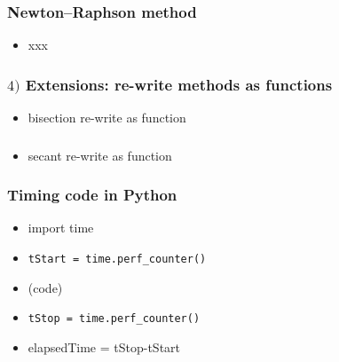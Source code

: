 \documentclass[english,14pt]{beamer}
\begin{document}

\begin{frame}[fragile]

\frametitle{Newton--Raphson method}

\begin{itemize}
	\item xxx
\end{itemize}

\end{frame}


\begin{frame}[fragile]

\frametitle{$4)$ Extensions: re-write methods as functions}

\begin{itemize}
	\item bisection re-write as function
\end{itemize}		

\end{frame}


\begin{frame}[fragile]

\frametitle{}

\begin{itemize}
	\item secant re-write as function
\end{itemize}		

\end{frame}


\begin{frame}[fragile]

\frametitle{Timing code in Python}

\begin{itemize}
	\item import time
	\item \verb+tStart = time.perf_counter()+
	\item (code)
	\item \verb+tStop = time.perf_counter()+
	\item elapsedTime = tStop-tStart
\end{itemize}

\end{frame}
\end{document}
